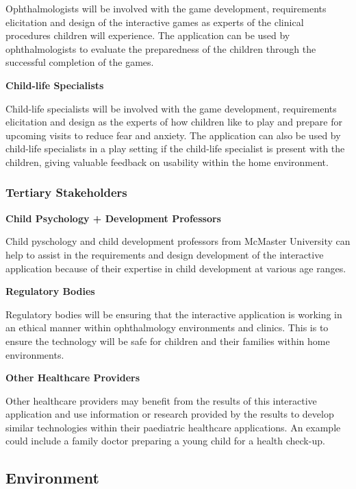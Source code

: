 \documentclass{article}
\begin{document}
        Ophthalmologists will be involved with the game development, requirements 
        elicitation and design of the interactive games as experts of the clinical 
        procedures children will experience. The application can be used by 
        ophthalmologists to evaluate the preparedness of the children through the 
        successful completion of the games. 

        \textbf{Child-life Specialists}

        Child-life specialists will be involved with the game development, 
        requirements elicitation and design as the experts of how children like to 
        play and prepare for upcoming visits to reduce fear and anxiety. The 
        application can also be used by child-life specialists in a play setting 
        if the child-life specialist is present with the children, giving valuable 
        feedback on usability within the home environment.

    \subsubsection{Tertiary Stakeholders}

        \textbf{Child Psychology + Development Professors}

        Child pyschology and child development professors from McMaster University 
        can help to assist in the requirements and design development of the interactive 
        application because of their expertise in child development at various age ranges.

        \textbf{Regulatory Bodies}
        
        Regulatory bodies will be ensuring that the interactive application is working in 
        an ethical manner within ophthalmology environments and clinics. This is to ensure 
        the technology will be safe for children and their families within home environments.

        \textbf{Other Healthcare Providers}

        Other healthcare providers may benefit from the results of this interactive 
        application and use information or research provided by the results to develop 
        similar technologies within their paediatric healthcare applications. An example 
        could include a family doctor preparing a young child for a health check-up.

\subsection{Environment}
\end{document}
